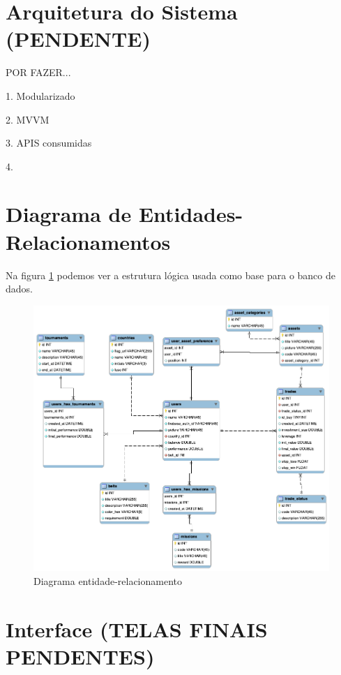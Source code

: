 \section{Arquitetura do Sistema (PENDENTE)} \label{sec:modelagem:arquitetura}

POR FAZER...

1. Modularizado

2. MVVM

3. APIS consumidas

4. 

\section{Diagrama de Entidades-Relacionamentos} \label{sec:modelagem:der}

Na figura \ref{fig:uml_der} podemos ver a estrutura lógica usada como base para o banco de dados.

\begin{figure}[H]
  \caption{\label{fig:uml_der}Diagrama entidade-relacionamento}
  \centering
  \includegraphics[scale=0.5]{imagens/tfc_der.png}
\end{figure}

\section{Interface (TELAS FINAIS PENDENTES)} \label{sec:modelagem:interface}

